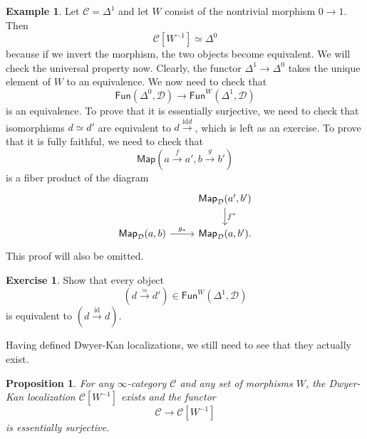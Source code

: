 \documentclass[10pt, oneside]{memoir}
\newtheorem{prop}[thm]{Proposition}
\theoremstyle{definition}
\newtheorem{exm}[thm]{Example}
\newtheorem{exer}[thm]{Exercise}
\theoremstyle{remark}
\theoremstyle{plain}
\theoremstyle{definition}
\theoremstyle{remark}
\newcommand{\mc}[1]{\mathcal{#1}}
\newcommand{\mr}[1]{\mathrm{#1}}
\newcommand{\ms}[1]{\mathsf{#1}}
\newcommand{\1}{\mathbf{1}}
\newcommand{\2}{\mathbf{2}}
\newcommand{\3}{\mathbf{3}}
\begin{document}
\begin{exm}
    Let $\mc{C} = \Delta^1$ and let $W$ consist of the nontrivial morphism $0 \to 1$. Then 
    \[ \mc{C}[W^{-1}] \simeq \Delta^0 \]
    because if we invert the morphism, the two objects become equivalent. We will check the universal property now. Clearly, the functor $\Delta^1 \to \Delta^0$ takes the unique element of $W$ to an equivalence. We now need to check that
    \[ \ms{Fun}(\Delta^0, \mc{D}) \to \ms{Fun}^W(\Delta^1, \mc{D}) \]
    is an equivalence. To prove that it is essentially surjective, we need to check that isomorphisms $d \simeq d'$ are equivalent to $d \xrightarrow{\mr{id} d}$, which is left as an exercise. To prove that it is fully faithful, we need to check that
    \[ \ms{Map} (a \xrightarrow{f} a', b \xrightarrow{g} b') \]
    is a fiber product of the diagram
    \begin{equation*}
    \begin{tikzcd}
        & \ms{Map}_{\mc{D}}(a', b') \ar{d}{f^*} \\
        \ms{Map}_{\mc{D}}(a, b) \ar{r}{g_*} & \ms{Map}_{\mc{D}}(a, b').
    \end{tikzcd}
    \end{equation*}
    This proof will also be omitted.
\end{exm}

\begin{exer}
    Show that every object
    \[ (d \xrightarrow{\simeq} d') \in \ms{Fun}^W(\Delta^1, \mc{D}) \]
    is equivalent to $(d \xrightarrow{\mr{id}} d)$.
\end{exer}

Having defined Dwyer-Kan localizations, we still need to see that they actually exist.

\begin{prop}
    For any $\infty$-category $\mc{C}$ and any set of morphisms $W$, the Dwyer-Kan localization $\mc{C}[W^{-1}]$ exists and the functor
    \[ \mc{C} \to \mc{C}[W^{-1}] \]
    is essentially surjective.
\end{prop}
\end{document}
